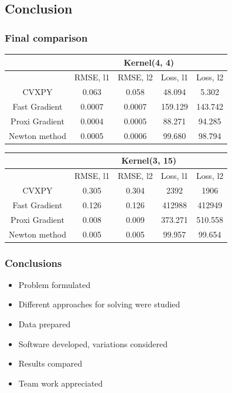 \documentclass[hyperref={pdfpagelabels=false}]{beamer}
\begin{document}
\subsection{Conclusion}
\begin{frame}
\frametitle{Final comparison}

\begin{table}
\centering\medskip{}
\begin{tabular}{|c||c|c|c|c||}
\hline
& \multicolumn{4}{c||}{Kernel(4, 4)} \\
\hline
 & RMSE, l1 & RMSE, l2 & Loss, l1 & Loss, l2 \\	
\hline
CVXPY &  0.063  & 0.058  & 48.094  & 5.302   \\
\hline
Fast Gradient & 0.0007 & 0.0007 & 159.129 & 143.742  \\
\hline
Proxi Gradient & 0.0004 & 0.0005 & 88.271 & 94.285  \\
\hline
Newton method & 0.0005 & 0.0006 & 99.680 & 98.794  \\
\hline
\end{tabular}
\end{table}

\begin{table}
\centering\medskip\tabcolsep=6pt
\begin{tabular}{|c||c|c|c|c||}
\hline
& \multicolumn{4}{c||}{Kernel(3, 15)} \\
\hline
 & RMSE, l1 & RMSE, l2 & Loss, l1 & Loss, l2 \\	
\hline
CVXPY & 0.305  & 0.304  &  2392 & 1906  \\
\hline
Fast Gradient & 0.126 & 0.126 & 412988 & 412949  \\
\hline
Proxi Gradient & 0.008 & 0.009 & 373.271 & 510.558 \\
\hline
Newton method & 0.005 & 0.005 & 99.957 & 99.654  \\
\hline
\end{tabular}
\end{table}

\end{frame}

\begin{frame}
\frametitle{Conclusions}

\begin{itemize}
\item Problem formulated 
\item Different approaches for solving were studied
\item Data prepared
\item Software developed, variations considered
\item Results compared
\item Team work appreciated
\end{itemize}

\end{frame}
\end{document}
